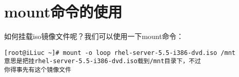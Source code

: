 
\section{mount命令的使用}
\label{sec:mountCmd}

如何挂载iso镜像文件呢？我们可以使用一下mount命令：

\small{
\begin{verbatim}
[root@iLiuc ~]# mount -o loop rhel-server-5.5-i386-dvd.iso /mnt
意思是把挂rhel-server-5.5-i386-dvd.iso载到/mnt目录下，不过
你得事先有这个镜像文件
\end{verbatim}
}
\normalsize
